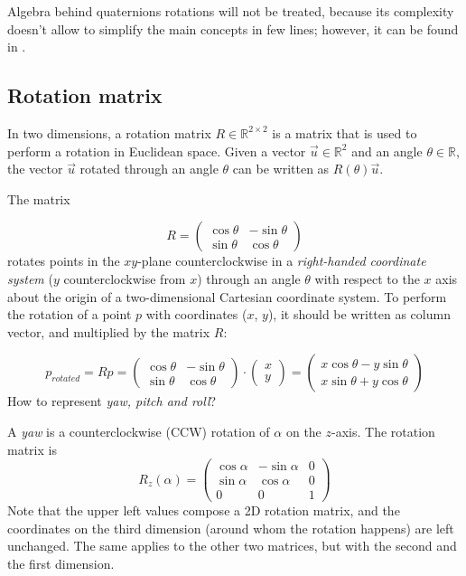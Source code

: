 Algebra behind quaternions rotations will not be treated, because its complexity doesn't allow to simplify the main concepts in few lines; however, it can be found in \cite[127-134]{Kui99}.

\subsection{Rotation matrix}
In two dimensions, a rotation matrix $R \in \mathbb R^{2 \times 2}$ is a matrix that is used to perform a rotation in Euclidean space. Given a vector $\vec u \in \mathbb R^2$ and an angle $\theta \in \mathbb R$, the vector $\vec u$ rotated through an angle $\theta$ can be written as $R(\theta) \vec u$.

The matrix

\[
	R =
	{\begin{pmatrix}
		\cos \theta & -\sin \theta \\
		\sin \theta & \cos \theta
	\end{pmatrix}}
\]
rotates points in the $xy$-plane counterclockwise in a \textit{right-handed coordinate system} ($y$ counterclockwise from $x$) through an angle $\theta$ with respect to the $x$ axis about the origin of a two-dimensional Cartesian coordinate system. To perform the rotation of a point $p$ with coordinates ($x$, $y$), it should be written as column vector, and multiplied by the matrix $R$:

\[
	p_{rotated} = Rp =
	{\begin{pmatrix}
		\cos \theta &-\sin \theta \\
		\sin \theta &\cos \theta
	\end{pmatrix}}
	\cdot
	{\begin{pmatrix}
		x \\
		y
	\end{pmatrix}} =
	{\begin{pmatrix}
		x\cos \theta -y\sin \theta \\
		x\sin \theta +y\cos \theta
	\end{pmatrix}}
\]
How to represent \textit{yaw, pitch and roll}?

A \textit{yaw} is a counterclockwise (CCW) rotation of $\alpha$ on the $z$-axis. The rotation matrix is
\[
	R_z(\alpha) =
	\begin{pmatrix}
		\cos\alpha & -\sin\alpha & 0 \\
		\sin\alpha & \cos\alpha & 0 \\
		0 & 0 & 1
	\end{pmatrix}
\]
Note that the upper left values compose a 2D rotation matrix, and the coordinates on the third dimension (around whom the rotation happens) are left unchanged. The same applies to the other two matrices, but with the second and the first dimension.
\bigskip


